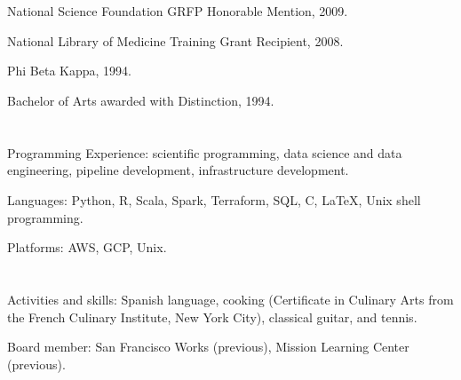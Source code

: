 \begin{resume}


\section{}
\begin{listitems}
\item National Science Foundation GRFP Honorable Mention, 2009.
\item National Library of Medicine Training Grant Recipient, 2008.
\item Phi Beta Kappa, 1994.
\item Bachelor of Arts awarded with Distinction, 1994.
\end{listitems}

\section{}
\begin{listitems}
\item{Programming Experience: scientific programming, data science and data engineering, pipeline development, infrastructure development.}
\item{Languages:  Python, R, Scala, Spark, Terraform, SQL, C, \LaTeX{}, Unix shell programming.}
\item{Platforms: AWS, GCP, Unix.}
\end{listitems}

\section{}
\begin{listitems}
\item Activities and skills: Spanish language, cooking (Certificate
  in Culinary Arts from the French Culinary Institute, New York City), classical
  guitar, and tennis.
\item Board member: San Francisco Works (previous), Mission Learning
  Center (previous).
\end{listitems}



\end{resume}

